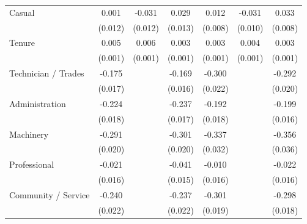 {\begin{tabular}{l*{6}{c}}
Casual              &       0.001         &      -0.031\sym{**} &       0.029\sym{**} &       0.012         &      -0.031\sym{***}&       0.033\sym{***}\\
                    &     (0.012)         &     (0.012)         &     (0.013)         &     (0.008)         &     (0.010)         &     (0.008)         \\
Tenure              &       0.005\sym{***}&       0.006\sym{***}&       0.003\sym{***}&       0.003\sym{***}&       0.004\sym{***}&       0.003\sym{***}\\
                    &     (0.001)         &     (0.001)         &     (0.001)         &     (0.001)         &     (0.001)         &     (0.001)         \\
Technician / Trades &      -0.175\sym{***}&                     &      -0.169\sym{***}&      -0.300\sym{***}&                     &      -0.292\sym{***}\\
                    &     (0.017)         &                     &     (0.016)         &     (0.022)         &                     &     (0.020)         \\
Administration      &      -0.224\sym{***}&                     &      -0.237\sym{***}&      -0.192\sym{***}&                     &      -0.199\sym{***}\\
                    &     (0.018)         &                     &     (0.017)         &     (0.018)         &                     &     (0.016)         \\
Machinery           &      -0.291\sym{***}&                     &      -0.301\sym{***}&      -0.337\sym{***}&                     &      -0.356\sym{***}\\
                    &     (0.020)         &                     &     (0.020)         &     (0.032)         &                     &     (0.036)         \\
Professional        &      -0.021         &                     &      -0.041\sym{***}&      -0.010         &                     &      -0.022         \\
                    &     (0.016)         &                     &     (0.015)         &     (0.016)         &                     &     (0.016)         \\
Community / Service &      -0.240\sym{***}&                     &      -0.237\sym{***}&      -0.301\sym{***}&                     &      -0.298\sym{***}\\
                    &     (0.022)         &                     &     (0.022)         &     (0.019)         &                     &     (0.018)         \\

\end{tabular}}
